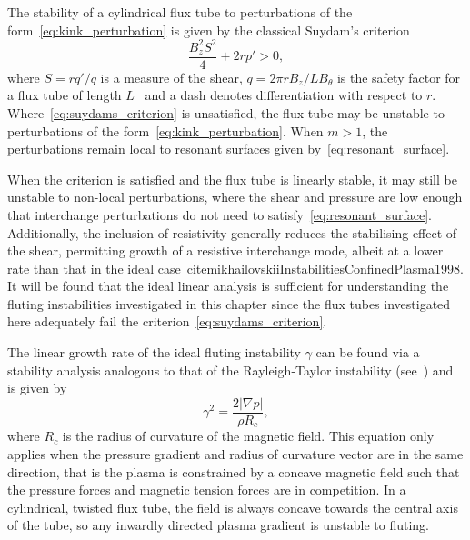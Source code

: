 The stability of a cylindrical flux tube to perturbations of the form~\ref{eq:kink_perturbation} is given by the classical Suydam's criterion
\begin{equation}
  \label{eq:suydams_criterion}
\frac{B_z^2 S^2}{4} + 2 r p' > 0,
\end{equation}
where $S = r q'/q$ is a measure of the shear, $q = 2\pi r B_z / L B_{\theta}$ is the safety factor for a flux tube of length $L$~\cite{mikhailovskiiInstabilitiesConfinedPlasma1998} and a dash denotes differentiation with respect to $r$. Where~\ref{eq:suydams_criterion} is unsatisfied, the flux tube may be unstable to perturbations of the form~\ref{eq:kink_perturbation}. When $m>1$, the perturbations remain local to resonant surfaces given by~\ref{eq:resonant_surface}.

When the criterion is satisfied and the flux tube is linearly stable, it may still be unstable to non-local perturbations, where the shear and pressure are low enough that interchange perturbations do not need to satisfy~\ref{eq:resonant_surface}. Additionally, the inclusion of resistivity generally reduces the stabilising effect of the shear, permitting growth of a resistive interchange mode, albeit at a lower rate than that in the ideal case~cite{mikhailovskiiInstabilitiesConfinedPlasma1998}. It will be found that the ideal linear analysis is sufficient for understanding the fluting instabilities investigated in this chapter since the flux tubes investigated here adequately fail the criterion~\ref{eq:suydams_criterion}.

The linear growth rate of the ideal fluting instability $\gamma$ can be found via a stability analysis analogous to that of the Rayleigh-Taylor instability (see~\cite{goldstonIntroductionPlasmaPhysics2020}) and is given by
\begin{equation}
  \label{eq:fluting_growth_rate}
\gamma^2 = \frac{2|\nabla p|}{\rho R_c},
\end{equation}
where $R_c$ is the radius of curvature of the magnetic field. This equation only applies when the pressure gradient and radius of curvature vector are in the same direction, that is the plasma is constrained by a concave magnetic field such that the pressure forces and magnetic tension forces are in competition. In a cylindrical, twisted flux tube, the field is always concave towards the central axis of the tube, so any inwardly directed plasma gradient is unstable to fluting.


